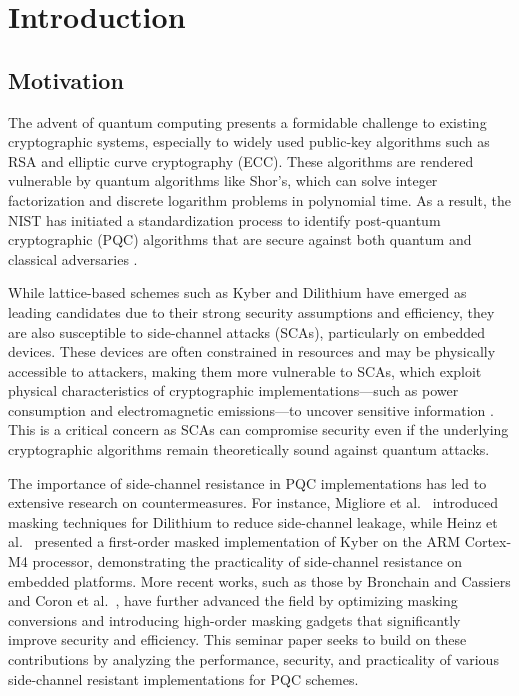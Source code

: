 \chapter{Introduction}

\section{Motivation}

The advent of quantum computing presents a formidable challenge to existing cryptographic systems, especially to widely used public-key algorithms such as RSA and elliptic curve cryptography (\ac{ECC}). These algorithms are rendered vulnerable by quantum algorithms like Shor's, which can solve integer factorization and discrete logarithm problems in polynomial time. As a result, the \ac{NIST} has initiated a standardization process to identify post-quantum cryptographic (\ac{PQC}) algorithms that are secure against both quantum and classical adversaries \cite{Azouaoui22}.

While lattice-based schemes such as Kyber and Dilithium have emerged as leading candidates due to their strong security assumptions and efficiency, they are also susceptible to side-channel attacks (\acp{SCA}), particularly on embedded devices. These devices are often constrained in resources and may be physically accessible to attackers, making them more vulnerable to \acp{SCA}, which exploit physical characteristics of cryptographic implementations—such as power consumption and electromagnetic emissions—to uncover sensitive information \cite{Bos21}. This is a critical concern as \acp{SCA} can compromise security even if the underlying cryptographic algorithms remain theoretically sound against quantum attacks.

The importance of side-channel resistance in \ac{PQC} implementations has led to extensive research on countermeasures. For instance, Migliore et al.\ \cite{Migliore19} introduced masking techniques for Dilithium to reduce side-channel leakage, while Heinz et al.\ \cite{Heinz20} presented a first-order masked implementation of Kyber on the \ac{ARM} Cortex-M4 processor, demonstrating the practicality of side-channel resistance on embedded platforms. More recent works, such as those by Bronchain and Cassiers \cite{Bronchain22} and Coron et al.\ \cite{Coron23}, have further advanced the field by optimizing masking conversions and introducing high-order masking gadgets that significantly improve security and efficiency. This seminar paper seeks to build on these contributions by analyzing the performance, security, and practicality of various side-channel resistant implementations for \ac{PQC} schemes.

